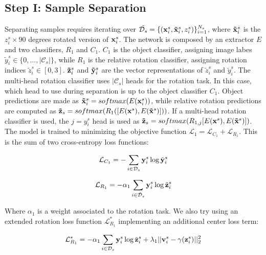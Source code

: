 \documentclass[10pt,twocolumn,letterpaper]{article}
\begin{document}
\subsection{Step I: Sample Separation}

Separating samples requires iterating over $\tilde{\mathcal{D}_s} = \{({\bf x}_i^s, {\bf \tilde x}_i^s, z_i^s)\}_{i=1}^{N_s}$,
where ${\bf \tilde x}_i^s$ is the $z_i^s\times 90$ degrees rotated version of ${\bf x}_i^s$.
The network is composed by an extractor $E$ and two classifiers, 
$R_1$ and $C_1$.
$C_1$ is the object classifier, 
assigning image labes $\tilde{y}_i^s \in \{0, \dots, |\mathcal{C}_s|\}$,
while $R_1$ is the relative rotation classifier,
assigning rotation indices $\tilde{z}_i^s \in [0, 3]$.
${\bf\tilde{z}}_i^s$ and ${\bf\tilde{y}}_i^s$ are the vector representations of $\tilde{z}_i^s$ and $\tilde{y}_i^s$.
The multi-head rotation classifier uses $|\mathcal{C}_s|$ heads for the rotation task.
In this case, 
which head to use during separation is up to the object classifier $C_1$.
Object predictions are made as ${\bf\tilde{x}}_i^s = softmax(E({\bf x}_i^s))$,
while relative rotation predictions are computed as ${\bf \tilde z}_s = softmax(R_1([E({\bf x}^s), E({\bf\tilde x}^s)]))$.
If a multi-head rotation classifier is used,
the $j = y_i^s$ head is used as ${\bf\tilde{z}}_s = softmax(R_{1,j}[E({\bf x}^s), E({\bf\tilde{x}}^s)])$.
The model is trained to minimizing the objective function $\mathcal{L}_1 = \mathcal{L}_{C_1} + \mathcal{L}_{R_1}$.
This is the sum of two cross-entropy loss functions:

\begin{equation}
  \mathcal{L}_{C_1} = -\sum_{i\in\mathcal{D}_s} {\bf y}_i^s \log \tilde{\bf y}_i^s
  \label{eq:baseloss_class}
\end{equation}

\begin{equation}
  \mathcal{L}_{R_1} = -\alpha_1\sum_{i\in\mathcal{\tilde{D}}_s} {\bf y}_i^s \log \tilde{{\bf z}}_i^s
  \label{eq:baseloss_rot}
\end{equation}

Where $\alpha_1$ is a weight associated to the rotation task.
We also try using an extended rotation loss function $\mathcal{L}_{R_1}^*$ implementing an additional center loss\cite{CenterLoss} term:

\begin{equation}
  \mathcal{L}_{R_1}^* = -\alpha_1\sum_{i\in\mathcal{D}_s} {\bf y}_i^s \log \tilde{{\bf z}}_i^s+\lambda_1||{\bf v}_i^s-\gamma({\bf z}_i^s)||_2^2
  \label{eq:center_loss}
\end{equation}
\end{document}
